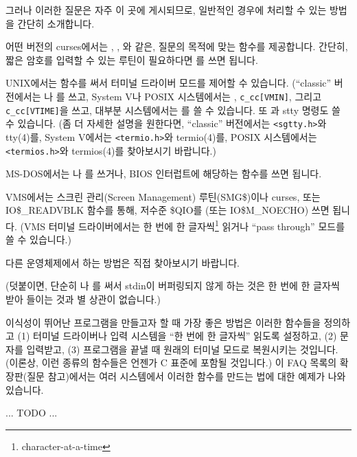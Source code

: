 \begin{faq}
	그러나 이러한 질문은 자주 이 곳에 게시되므로, 일반적인 경우에
	처리할 수 있는 방법을 간단히 소개합니다.

	어떤 버전의 curses에서는 , , 와
	같은, 질문의 목적에 맞는 함수를 제공합니다.  간단히, 짧은 암호를
	입력할 수 있는 루틴이 필요하다면 를 쓰면 됩니다.


	UNIX에서는  함수를 써서 터미널 드라이버 모드를
	제어할 수 있습니다.  (``classic'' 버전에서는 나 를
	쓰고, System V나 POSIX 시스템에서는 , \verb+c_cc[VMIN]+,
	그리고 \verb+c_cc[VTIME]+을 쓰고, 
	대부분 시스템에서는 를 쓸 수 있습니다.
	또 과 stty 명령도 쓸 수 있습니다.  (좀 더 자세한
	설명을 원한다면, ``classic'' 버전에서는 \verb+<sgtty.h>+와
	tty(4)를, System V에서는 \verb+<termio.h>+와 termio(4)를,
	POSIX 시스템에서는 \verb+<termios.h>+와 termios(4)를 찾아보시기
	바랍니다.)


	MS-DOS에서는 나 를 쓰거나, BIOS
	인터럽트에 해당하는 함수를 쓰면 됩니다.


	VMS에서는 스크린 관리(Screen Management) 루틴(SMG\$)이나
	curses, 또는 IO\$\_READVBLK 함수를 통해, 저수준 \$QIO를 (또는
	IO\$M\_NOECHO) 쓰면 됩니다.  (VMS 터미널 드라이버에서는
	한 번에 한 글자씩\footnote{character-at-a-time} 읽거나
	``pass through'' 모드를 쓸 수 있습니다.)

	다른 운영체제에서 하는 방법은 직접 찾아보시기 바랍니다.

	(덧붙이면, 단순히 나 를 써서
	stdin이 버퍼링되지 않게 하는 것은 한 번에 한 글자씩 받아 들이는
	것과 별 상관이 없습니다.)

	이식성이 뛰어난 프로그램을 만들고자 할 때 가장 좋은 방법은
	이러한 함수들을 정의하고 (1) 터미널 드라이버나 입력 시스템을
	``한 번에 한 글자씩'' 읽도록 설정하고, (2) 문자를 입력받고, (3)
	프로그램을 끝낼 때 원래의 터미널 모드로 복원시키는 것입니다.
	(이론상, 이런 종류의 함수들은 언젠가 C 표준에 포함될 것입니다.)
	이 FAQ 목록의 확장판(질문  참고)에서는 여러 시스템에서
	이러한 함수를 만드는 법에 대한 예제가 나와 있습니다.

        ... TODO ...


\end{faq}

